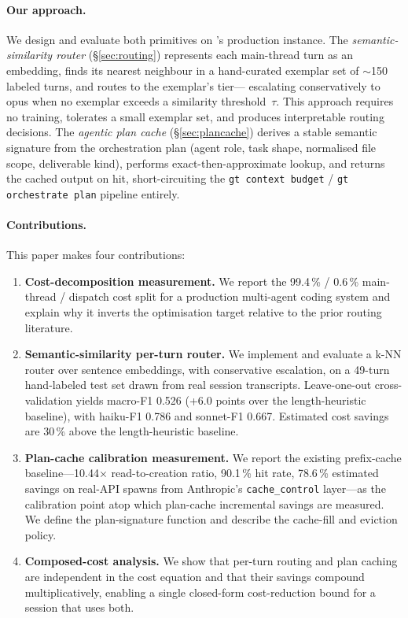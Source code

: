 \paragraph{Our approach.}
We design and evaluate both primitives on \blackrim's production
instance. The \emph{semantic-similarity router} (\S\ref{sec:routing})
represents each main-thread turn as an embedding, finds its
nearest neighbour in a hand-curated exemplar set of
\(\sim\)150 labeled turns, and routes to the exemplar's tier---
escalating conservatively to opus when no exemplar exceeds a
similarity threshold~\(\tau\). This approach requires no training,
tolerates a small exemplar set, and produces interpretable routing
decisions. The \emph{agentic plan cache} (\S\ref{sec:plancache})
derives a stable semantic signature from the orchestration plan
(agent role, task shape, normalised file scope, deliverable kind),
performs exact-then-approximate lookup, and returns the cached
output on hit, short-circuiting the \texttt{gt context budget}
/ \texttt{gt orchestrate plan} pipeline entirely.

\paragraph{Contributions.}
This paper makes four contributions:

\begin{enumerate}[label=(\roman*),leftmargin=2em]
  \item \textbf{Cost-decomposition measurement.} We report the
    99.4\,\% / 0.6\,\% main-thread / dispatch cost split for a
    production multi-agent coding system and explain why it
    inverts the optimisation target relative to the prior routing
    literature.

  \item \textbf{Semantic-similarity per-turn router.} We implement
    and evaluate a k-NN router over sentence embeddings, with
    conservative escalation, on a 49-turn hand-labeled test set
    drawn from real session transcripts. Leave-one-out
    cross-validation yields macro-F1 0.526 (+6.0 points over the
    length-heuristic baseline), with haiku-F1 0.786 and sonnet-F1
    0.667. Estimated cost savings are 30\,\% above the
    length-heuristic baseline.

  \item \textbf{Plan-cache calibration measurement.} We report
    the existing prefix-cache baseline---10.44\(\times\)
    read-to-creation ratio, 90.1\,\% hit rate, 78.6\,\% estimated
    savings on real-API spawns from Anthropic's
    \texttt{cache\_control} layer---as the calibration point atop
    which plan-cache incremental savings are measured. We define
    the plan-signature function and describe the cache-fill and
    eviction policy.

  \item \textbf{Composed-cost analysis.} We show that per-turn
    routing and plan caching are independent in the cost equation
    and that their savings compound multiplicatively, enabling a
    single closed-form cost-reduction bound for a session that uses
    both.
\end{enumerate}

